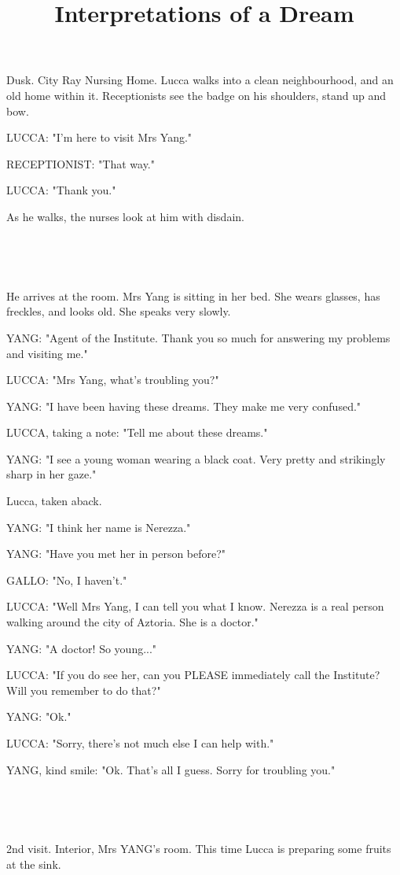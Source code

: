 \documentclass[11pt]{article}
\begin{document}
\ttfamily
\title{Interpretations of a Dream}
\maketitle

Dusk. City Ray Nursing Home.
Lucca walks into a clean neighbourhood, and an old home within it.
Receptionists see the badge on his shoulders, stand up and bow. 

LUCCA: "I'm here to visit Mrs Yang."

RECEPTIONIST: "That way."

LUCCA: "Thank you."

As he walks, the nurses look at him with disdain.

\ 

\ 

He arrives at the room.
Mrs Yang is sitting in her bed.
She wears glasses, has freckles, and looks old.
She speaks very slowly.

YANG: "Agent of the Institute. 
Thank you so much for answering my problems and visiting me."

LUCCA: "Mrs Yang, what's troubling you?"

YANG: "I have been having these dreams.
They make me very confused."

LUCCA, taking a note: "Tell me about these dreams."

YANG: "I see a young woman wearing a black coat.
Very pretty and strikingly sharp in her gaze."

Lucca, taken aback.

YANG: "I think her name is Nerezza."

YANG: "Have you met her in person before?"

GALLO: "No, I haven't."

LUCCA: "Well Mrs Yang, I can tell you what I know.
Nerezza is a real person walking around the city of Aztoria.
She is a doctor."

YANG: "A doctor! 
So young..."

LUCCA: "If you do see her, can you PLEASE immediately call the Institute?
Will you remember to do that?"

YANG: "Ok."

LUCCA: "Sorry, there's not much else I can help with."

YANG, kind smile: "Ok. That's all I guess.
Sorry for troubling you."

\ 

\ 

2nd visit.
Interior, Mrs YANG's room.
This time Lucca is preparing some fruits at the sink.
\end{document}

